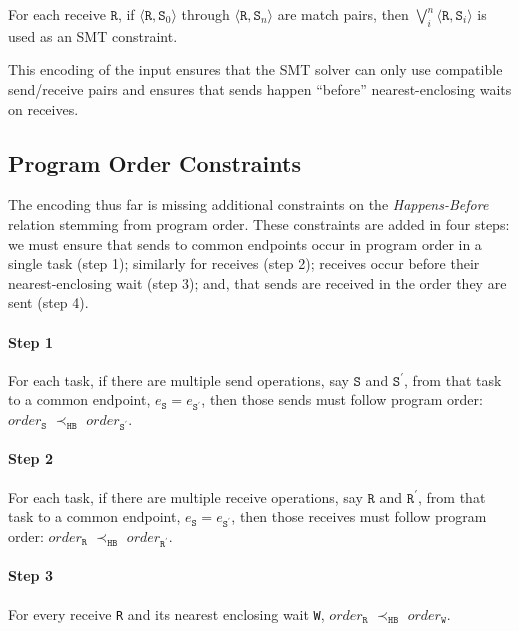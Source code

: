 \begin{definition}
For each receive $\mathtt{R}$, if $\langle\mathtt{R},
\mathtt{S}_0\rangle$ through $\langle\mathtt{R}, \mathtt{S}_n\rangle$
are match pairs, then $\bigvee_{i}^{n} \langle\mathtt{R},
\mathtt{S}_i\rangle$ is used as an SMT constraint.
\end{definition}

This encoding of the input ensures that the SMT solver can only use
compatible send/receive pairs and ensures that sends happen ``before''
nearest-enclosing waits on receives.

\subsection{Program Order Constraints}

The encoding thus far is missing
additional constraints on the \emph{Happens-Before} relation stemming from program order. These constraints are added in four steps: we must ensure that sends to common endpoints occur
in program order in a single task (step 1); similarly for receives
(step 2); receives occur before their nearest-enclosing wait (step 3);
and, that sends are received in the order they are sent (step 4).

\paragraph*{Step 1} For each task, if there are multiple send
operations, say $\mathtt{S}$ and $\mathtt{S^\prime}$, from that task
to a common endpoint, $e_\mathtt{S} = e_\mathtt{S^\prime}$, then those
sends must follow program order: $\mathit{order}_\mathtt{S}$
$\prec_\mathtt{HB}$ $\mathit{order}_\mathtt{S^\prime}$.

\paragraph*{Step 2} For each task, if there are multiple receive
operations, say $\mathtt{R}$ and $\mathtt{R^\prime}$, from that task
to a common endpoint, $e_\mathtt{S} = e_\mathtt{S^\prime}$, then those
receives must follow program order: $\mathit{order}_\mathtt{R}$
$\prec_\mathtt{HB}$ $\mathit{order}_\mathtt{R^\prime}$.

\paragraph*{Step 3} For every receive \texttt{R} and its nearest
enclosing wait \texttt{W}, $\mathit{order}_\mathtt{R}$
$\prec_\mathtt{HB}$ $\mathit{order}_\mathtt{W}$.

